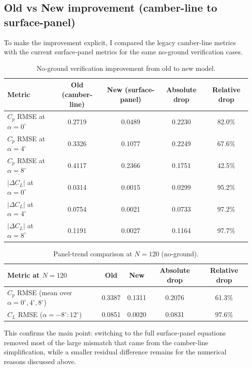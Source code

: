 \documentclass[11pt]{article}
\begin{document}
\subsection*{Old vs New improvement (camber-line to surface-panel)}
To make the improvement explicit, I compared the legacy camber-line metrics with the current surface-panel metrics for the same no-ground verification cases.

\begin{table}[H]
\centering
\caption{No-ground verification improvement from old to new model.}
\label{tab:oldnew-verify}
\begin{tabular}{lcccc}
\toprule
Metric & Old (camber-line) & New (surface-panel) & Absolute drop & Relative drop \\
\midrule
$C_p$ RMSE at $\alpha=0^\circ$ & 0.2719 & 0.0489 & 0.2230 & 82.0\% \\
$C_p$ RMSE at $\alpha=4^\circ$ & 0.3326 & 0.1077 & 0.2249 & 67.6\% \\
$C_p$ RMSE at $\alpha=8^\circ$ & 0.4117 & 0.2366 & 0.1751 & 42.5\% \\
$|\Delta C_L|$ at $\alpha=0^\circ$ & 0.0314 & 0.0015 & 0.0299 & 95.2\% \\
$|\Delta C_L|$ at $\alpha=4^\circ$ & 0.0754 & 0.0021 & 0.0733 & 97.2\% \\
$|\Delta C_L|$ at $\alpha=8^\circ$ & 0.1191 & 0.0027 & 0.1164 & 97.7\% \\
\bottomrule
\end{tabular}
\end{table}

\begin{table}[H]
\centering
\caption{Panel-trend comparison at $N=120$ (no-ground).}
\label{tab:oldnew-panel120}
\begin{tabular}{lcccc}
\toprule
Metric at $N=120$ & Old & New & Absolute drop & Relative drop \\
\midrule
$C_p$ RMSE (mean over $\alpha=0^\circ,4^\circ,8^\circ$) & 0.3387 & 0.1311 & 0.2076 & 61.3\% \\
$C_L$ RMSE ($\alpha=-8^\circ:12^\circ$) & 0.0851 & 0.0020 & 0.0831 & 97.6\% \\
\bottomrule
\end{tabular}
\end{table}

This confirms the main point: switching to the full surface-panel equations removed most of the large mismatch that came from the camber-line simplification, while a smaller residual difference remains for the numerical reasons discussed above.
\end{document}

